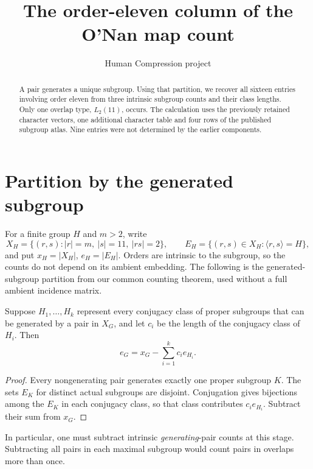 \documentclass[11pt,a4paper]{article}
\title{The order-eleven column of the O'Nan map count}
\author{Human Compression project}\date{}
\begin{document}
\maketitle
\begin{abstract}
A pair generates a unique subgroup. Using that partition, we recover all
sixteen entries involving order eleven from three intrinsic subgroup
counts and their class lengths. Only one overlap type, $L_2(11)$, occurs.
The calculation uses the previously retained character vectors, one
additional character table and four rows of the published subgroup atlas.
Nine entries were not determined by the earlier components.
\end{abstract}
\section{Partition by the generated subgroup}
For a finite group $H$ and $m>2$, write
\[
 X_H=\{(r,s):|r|=m,\ |s|=11,\ |rs|=2\},\qquad
 E_H=\{(r,s)\in X_H:\langle r,s\rangle=H\},
\]
and put $x_H=|X_H|$, $e_H=|E_H|$. Orders are intrinsic to the
subgroup, so the counts do not depend on its ambient embedding.
The following is the generated-subgroup partition from our common
counting theorem, used without a full ambient incidence matrix.
\begin{lemma}\label{partition}
Suppose $H_1,\ldots,H_k$ represent every conjugacy class of proper
subgroups that can be generated by a pair in $X_G$, and let $c_i$
be the length of the conjugacy class of $H_i$. Then
\[
 e_G=x_G-\sum_{i=1}^k c_i e_{H_i}.
\]
\end{lemma}
\begin{proof}
Every nongenerating pair generates exactly one proper subgroup $K$.
The sets $E_K$ for distinct actual subgroups are disjoint. Conjugation
gives bijections among the $E_K$ in each conjugacy class, so that class
contributes $c_i e_{H_i}$. Subtract their sum from $x_G$.
\end{proof}
In particular, one must subtract intrinsic \emph{generating}-pair
counts at this stage. Subtracting all pairs in each maximal subgroup
would count pairs in overlaps more than once.
\end{document}
